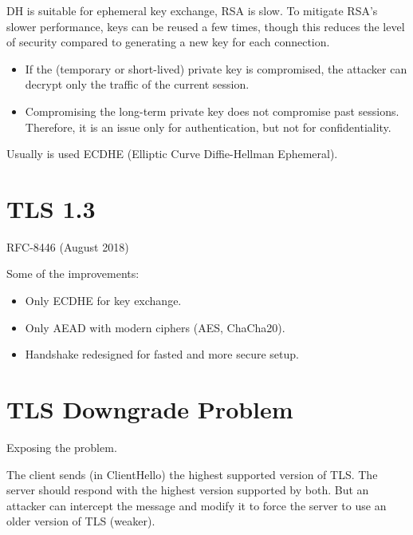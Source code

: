 \vspace{0.2cm}

DH is suitable for ephemeral key exchange, RSA is slow. To mitigate RSA's slower performance, keys can be reused a few times, though this reduces the level of security compared to generating a new key for each connection.

\begin{itemize}
    \item If the (temporary or short-lived) private key is compromised, the attacker can decrypt only the traffic of the current session.
    \item Compromising the long-term private key does not compromise past sessions. Therefore, it is an issue only for authentication, but not for confidentiality.
\end{itemize}

Usually is used ECDHE (Elliptic Curve Diffie-Hellman Ephemeral).

\section{TLS 1.3}
\begin{center}
    RFC-8446 (August 2018)
\end{center}

Some of the improvements:
\begin{itemize}
    \item Only ECDHE for key exchange.
    \item Only AEAD with modern ciphers (AES, ChaCha20).
    \item Handshake redesigned for fasted and more secure setup.
\end{itemize}

\clearpage

\section{TLS Downgrade Problem}
\begin{center}
    Exposing the problem.
\end{center}
The client sends (in ClientHello) the highest supported version of TLS. The server should respond with the highest version supported by both. But an attacker can intercept the message and modify it to force the server to use an older version of TLS (weaker).

